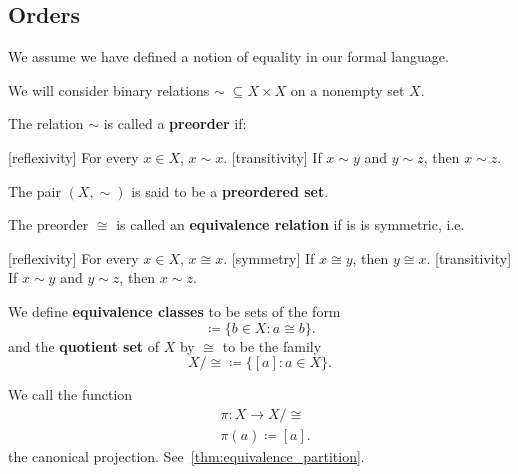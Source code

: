 \subsection{Orders}\label{subsec:orders}

We assume we have defined a notion of equality in our formal language.

\begin{definition}\label{def:order}
  We will consider binary relations \( \sim\; \subseteq X \times X \) on a nonempty set \( X \).

  \begin{defenum}
    \cite{nLab:preorder} The relation \( \sim \) is called a \textbf{preorder} if:
    \begin{description}
      [reflexivity] For every \( x \in X \), \( x \sim x \).
      [transitivity] If \( x \sim y \) and \( y \sim z \), then \( x \sim z \).
    \end{description}

    The pair \( (X, \sim) \) is said to be a \textbf{preordered set}.

    \cite[56]{Enderton1977} The preorder \( \cong \) is called an \textbf{equivalence relation} if is is symmetric, i.e.
    \begin{description}
      [reflexivity] For every \( x \in X \), \( x \cong x \).
      [symmetry] If \( x \cong y \), then \( y \cong x \).
      [transitivity] If \( x \sim y \) and \( y \sim z \), then \( x \sim z \).
    \end{description}

    We define \textbf{equivalence classes} to be sets of the form
    \begin{equation*}
      [a] \coloneqq \{ b \in X \colon a \cong b \}.
    \end{equation*}
    and the \textbf{quotient set} of \( X \) by \( \cong \) to be the family
    \begin{equation*}
      X / \cong \coloneqq \{ [a] \colon a \in X \}.
    \end{equation*}

    We call the function
    \begin{align*}
      &\pi: X \to X / \cong \\
      &\pi(a) \coloneqq [a].
    \end{align*}
    the canonical projection. See~\cref{thm:equivalence_partition}.


\end{defenum}
\end{definition}
